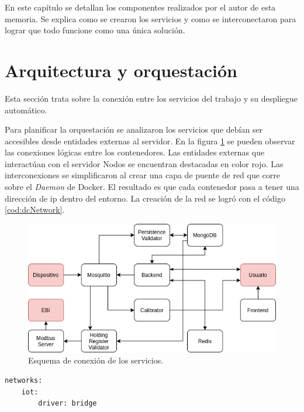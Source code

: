 En este capítulo se detallan los componentes realizados por el autor de esta memoria.
Se explica como se crearon los servicios y como se interconectaron para lograr que todo funcione como una única solución.

\section{Arquitectura y orquestación}
\label{ch3Arq}
Esta sección trata sobre la conexión entre los servicios del trabajo y su despliegue automático.

Para planificar la orquestación se analizaron los servicios que debían ser accesibles desde entidades externas al servidor.
En la figura \ref{fig:ch3EsquemaTrabajo} se pueden observar las conexiones lógicas entre los contenedores.
Las entidades externas que interactúan con el servidor Nodos se encuentran destacadas en color rojo.
Las interconexiones se simplificaron al crear una capa de puente de red que corre sobre el \emph{Daemon} de Docker.
El resultado es que cada contenedor pasa a tener una dirección de ip dentro del entorno.
La creación de la red se logró con el código \ref{cod:dcNetwork}.

\begin{figure}[h]
	\centering
	\includegraphics[width=\textwidth]{./Figures/ch3EsquemaTrabajo.png}
	\caption{Esquema de conexión de los servicios.}
	\label{fig:ch3EsquemaTrabajo}
\end{figure}

\begin{lstlisting}[label=cod:dcNetwork,caption=Red de interconexión Docker Compose.]
networks: 
	iot:
		driver: bridge
\end{lstlisting}

